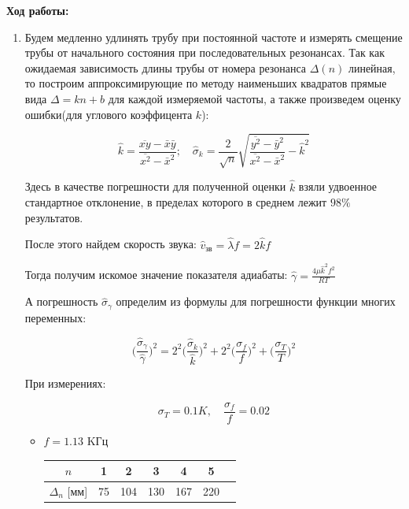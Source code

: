 \documentclass[12pt]{article}
\begin{document}
    \textbf{Ход работы:}

    \begin{enumerate}
    \item 
         Будем медленно удлинять трубу при постоянной частоте и измерять смещение трубы от начального состояния при последовательных резонансах.
    Так как ожидаемая зависимость длины трубы от номера резонанса $\Delta(n)$ линейная, то построим аппроксимирующие по методу наименьших квадратов прямые вида $\Delta = kn + b$ для каждой измеряемой частоты, а также произведем оценку ошибки(для углового коэффицента $k$):

    \begin{equation}
        \hat{k} = \frac{\overline{xy} - \bar{x}\bar{y}}{\overline{x^2} - \bar{x}^2} ;\quad \hat{\sigma}_k = \frac{2}{\sqrt{n}}\sqrt{\frac{\overline{y^2} - \bar{y}^2}{\overline{x^2} - \bar{x}^2} - \hat{k}^2}
    \end{equation}

    Здесь в качестве погрешности для полученной оценки $\hat{k}$  взяли удвоенное стандартное отклонение, в пределах которого в среднем лежит $98\%$ результатов.

    После этого найдем скорость звука: $\hat{v}_\text{зв} = \hat{\lambda} f = 2 \hat{k} f$

    Тогда получим искомое значение показателя адиабаты: $\hat{\gamma} = \frac{4\mu \hat{k}^2 f^2}{RT}$ 

    А погрешность $\hat{\sigma}_\gamma$ определим из формулы для погрешности функции многих переменных:

    \begin{equation}
        \bigg(\frac{\hat{\sigma}_\gamma}{\hat{\gamma}}\bigg) ^ 2 =    2^2 \bigg(\frac{\hat{\sigma}_k}{\hat{k}}\bigg) ^ 2 + 2^2 \bigg(\frac{\sigma_f}{f}\bigg) ^ 2 + \bigg(\frac{\sigma_T}{T}\bigg) ^ 2
    \end{equation}


    При измерениях:

    \begin{equation}
        \sigma_T = 0.1 K, \quad \frac{\sigma_f}{f} = 0.02 
    \end{equation}

    \begin{itemize}
        \item $f = 1.13$ KГц

        \begin{center}
                    \begin{tabular}{|c|c|c|c|c|c|c|}
                            \hline 
                                $n$ & 1 & 2 & 3 & 4 & 5 \\
                            \hline
                                $\Delta_n$ [мм]& 75&104&130&167&220\\
                            \hline
                    \end{tabular}
        \end{center}


\end{itemize}
\end{enumerate}
\end{document}
